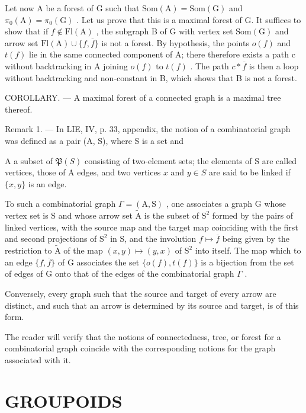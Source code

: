 Let now A be a forest of G such that \(\mathrm{Som}(\mathrm{A}) = \mathrm{Som}(\mathrm{G})\) and \(\pi_{0}(\mathrm{A}) = \pi_{0}(\mathrm{G})\) . Let us prove that this is a maximal forest of G. It suffices to show that if \(f \notin \mathrm{Fl}(\mathrm{A})\) , the subgraph B of G with vertex set \(\mathrm{Som}(\mathrm{G})\) and arrow set \(\mathrm{Fl}(\mathrm{A}) \cup \{f, \overline{f}\}\) is not a forest. By hypothesis, the points \(o(f)\) and \(t(f)\) lie in the same connected component of A; there therefore exists a path c without backtracking in A joining \(o(f)\) to \(t(f)\) . The path \(c * \overline{f}\) is then a loop without backtracking and non-constant in B, which shows that B is not a forest.

COROLLARY. --- A maximal forest of a connected graph is a maximal tree thereof.

Remark 1. --- In LIE, IV, p. 33, appendix, the notion of a combinatorial graph was defined as a pair (A, S), where S is a set and

A a subset of \(\mathfrak{P}(S)\) consisting of two-element sets; the elements of S are called vertices, those of A edges, and two vertices \(x\) and \(y \in S\) are said to be linked if \(\{x, y\}\) is an edge.

To such a combinatorial graph \(\Gamma = (\mathrm{A},\mathrm{S})\) , one associates a graph G whose vertex set is S and whose arrow set \(\widetilde{\mathrm{A}}\) is the subset of \(\mathrm{S}^2\) formed by the pairs of linked vertices, with the source map and the target map coinciding with the first and second projections of \(\mathrm{S}^2\) in S, and the involution \(f\mapsto \overline{f}\) being given by the restriction to \(\widetilde{\mathrm{A}}\) of the map \((x,y)\mapsto (y,x)\) of \(\mathrm{S}^2\) into itself. The map which to an edge \(\{f,\overline{f}\}\) of G associates the set \(\{o(f),t(f)\}\) is a bijection from the set of edges of G onto that of the edges of the combinatorial graph \(\Gamma\) .

Conversely, every graph such that the source and target of every arrow are distinct, and such that an arrow is determined by its source and target, is of this form.

The reader will verify that the notions of connectedness, tree, or forest for a combinatorial graph coincide with the corresponding notions for the graph associated with it.

\section{GROUPOIDS}

